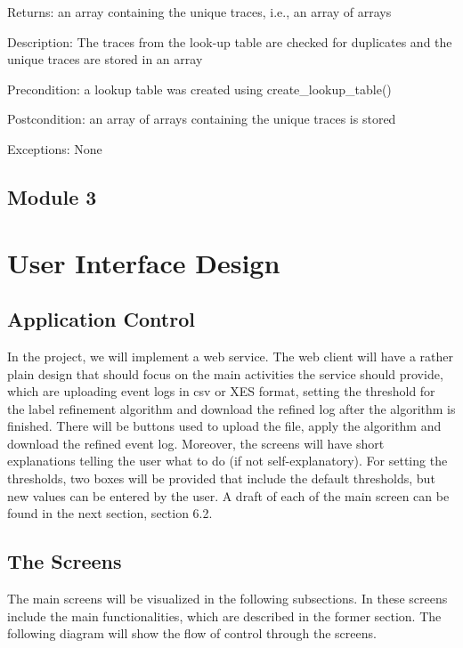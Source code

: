 \documentclass[notitlepage]{article}
\begin{document}
\begin{flushleft}
Returns: an array containing the unique traces, i.e., an array of arrays

Description: The traces from the look-up table are checked for duplicates and the unique traces are stored in an array

Precondition: a lookup table was created using create\_lookup\_table()

Postcondition: an array of arrays containing the unique traces is stored

Exceptions: None

\par
\endgroup

\subsection{Module 3}

\section{User Interface Design}
\subsection{Application Control}

In the project, we will implement a web service. The web client will have a rather plain design that should focus on the main activities the service should provide, which are uploading event logs in csv or XES format, setting the threshold for the label refinement algorithm and download the refined log after the algorithm is finished. There will be buttons used to upload the file, apply the algorithm and download the refined event log. Moreover, the screens will have short explanations telling the user what to do (if not self-explanatory). For setting the thresholds, two boxes will be provided that include the default thresholds, but new values can be entered by the user. A draft of each of the main screen can be found in the next section, section 6.2.

\subsection{The Screens}

The main screens will be visualized in the following subsections. In these screens include the main functionalities, which are described in the former section. The following diagram will show the flow of control through the screens.  


\end{flushleft}
\end{document}
